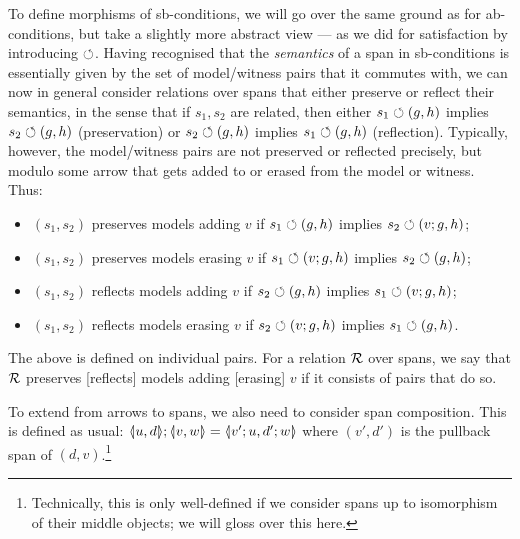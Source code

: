 To define morphisms of sb-conditions, we will go over the same ground as for ab-conditions, but take a slightly more abstract view --- as we did for satisfaction by introducing $\circlearrowleft$. Having recognised that the \emph{semantics} of a span in sb-conditions is essentially given by the set of model/witness pairs that it commutes with, we can now in general consider relations over spans that either preserve or reflect their semantics, in the sense that if $s_1,s_2$ are related, then either $s_1\circlearrowleft (g,h)$ implies $s_2\circlearrowleft (g,h)$ (preservation) or $s_2\circlearrowleft (g,h)$ implies $s_1\circlearrowleft (g,h)$ (reflection). Typically, however, the model/witness pairs are not preserved or reflected precisely, but modulo some arrow that gets added to or erased from the model or witness. Thus:
%
\begin{itemize}
\item $(s_1,s_2)$ preserves models adding $v$ if $s_1\circlearrowleft (g,h)$ implies $s_2\circlearrowleft (v;g,h)$;
\item $(s_1,s_2)$ preserves models erasing $v$ if $s_1\circlearrowleft (v;g,h)$ implies $s_2\circlearrowleft (g,h)$;
\item $(s_1,s_2)$ reflects models adding $v$ if $s_2\circlearrowleft (g,h)$ implies $s_1\circlearrowleft (v;g,h)$;
\item $(s_1,s_2)$ reflects models erasing $v$ if $s_2\circlearrowleft (v;g,h)$ implies $s_1\circlearrowleft (g,h)$.
\end{itemize}
%
The above is defined on individual pairs. For a relation $\mathcal{R}$ over spans, we say that $\mathcal{R}$ preserves [reflects] models adding [erasing] $v$ if it consists of pairs that do so.

To extend  from arrows to spans, we also need to consider span composition. This is defined as usual: $\spanof u d;\spanof v w=\spanof{v';u}{d';w}$ where $(v',d')$ is the pullback span of $(d,v)$.\footnote{Technically, this is only well-defined if we consider spans up to isomorphism of their middle objects; we will gloss over this here.}

